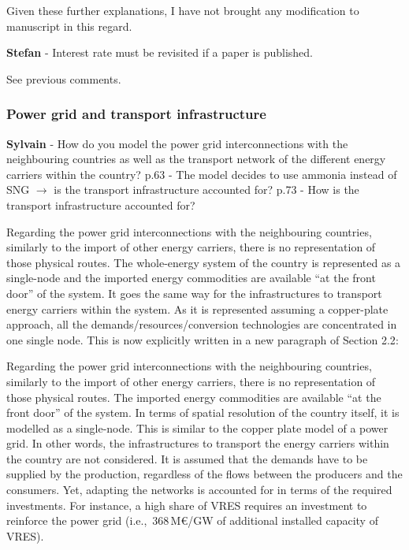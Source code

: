 \documentclass[12pt,a4paper]{article}
\def\ie{i.e.,\ }
\begin{document}
Given these further explanations, I have not brought any modification to manuscript in this regard.

\begin{mdframed}[style=comment] %
{\color{teal} \textbf{Stefan}} - Interest rate must be revisited if a paper is published.
\end{mdframed}

\noindent See previous comments.

\subsubsection{Power grid and transport infrastructure}

\begin{mdframed}[style=comment] %
{\color{purple} \textbf{Sylvain}} - How do you model the power grid interconnections with the neighbouring countries as well as the transport network of the different energy carriers within the country? p.63 - The model decides to use ammonia instead of SNG $\rightarrow$ is the transport infrastructure accounted for? p.73 - How is the transport infrastructure accounted for?
\end{mdframed}

\noindent Regarding the power grid interconnections with the neighbouring countries, similarly to the import of other energy carriers, there is no representation of those physical routes. The whole-energy system of the country is represented as a single-node and the imported energy commodities are available ``at the front door'' of the system. It goes the same way for the infrastructures to transport energy carriers within the system. As it is represented assuming a copper-plate approach, all the demands/resources/conversion technologies are concentrated in one single node. This is now explicitly written {\color{blue}in a new paragraph of Section 2.2}:

\begin{mdframed}[style=manuscript] %
Regarding the power grid interconnections with the neighbouring countries, similarly to the import of other energy carriers, there is no representation of those physical routes. The imported energy commodities are available ``at the front door'' of the system.  In terms of spatial resolution of the country itself, it is modelled as a single-node. This is similar to the copper plate model of a power grid. In other words, the infrastructures to transport the energy carriers within the country are not considered.  It is assumed that the demands have to be supplied by the production, regardless of the flows between the producers and the consumers. Yet, adapting the networks is accounted for in terms of the required investments. For instance, a high share of VRES requires an investment to reinforce the power grid (\ie 368\,M€/GW of additional installed capacity of VRES). 
\end{mdframed}
\end{document}
